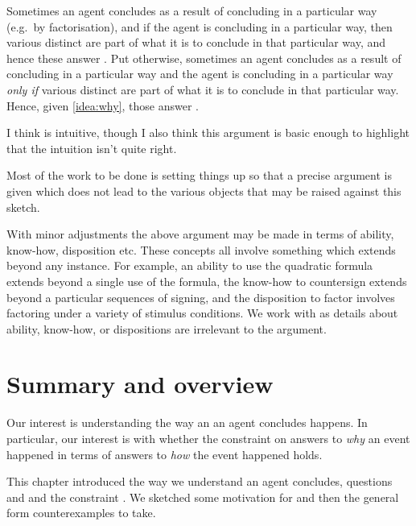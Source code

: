 \begin{note}
  Sometimes an agent concludes as a result of concluding in a particular way (e.g.\ by factorisation), and if the agent is concluding in a particular way, then various distinct  are part of what it is to conclude in that particular way, and hence these answer \qWhy{}.
  Put otherwise, sometimes an agent concludes as a result of concluding in a particular way and the agent is concluding in a particular way \emph{only if} various distinct  are part of what it is to conclude in that particular way.
  Hence, given \autoref{idea:why}, those \fingfr{} answer \qWhy{}.

  I think \issueInclusion{} is intuitive, though I also think this argument is basic enough to highlight that the intuition isn't quite right.

  Most of the work to be done is setting things up so that a precise argument is given which does not lead to the various objects that may be raised against this sketch.
\end{note}


\begin{note}
  With minor adjustments the above argument may be made in terms of ability, know-how, disposition etc.
  These concepts all involve something which extends beyond any instance.
  For example, an ability to use the quadratic formula extends beyond a single use of the formula, the know-how to countersign extends beyond a particular sequences of signing, and the disposition to factor involves factoring under a variety of stimulus conditions.
  We work with  as details about ability, know-how, or dispositions are irrelevant to the argument.
\end{note}

\section{Summary and overview}
\label{sec:conclusion}

\begin{note}
  Our interest is understanding the way an  an agent concludes happens.
  In particular, our interest is with whether the constraint on answers to \emph{why} an event happened in terms of answers to \emph{how} the event happened holds.
\end{note}


\begin{note}
  This chapter introduced the way we understand  an agent concludes, questions \qWhy{} and \qHow{} and the constraint \issueInclusion{}.
  We sketched some motivation for \issueInclusion{} and then the general form counterexamples to \issueInclusion{} take.
\end{note}


